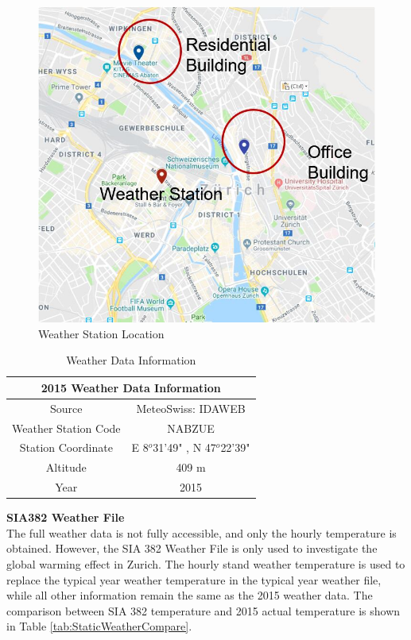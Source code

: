 \documentclass[a4paper, oneside]{discothesis}
\begin{document}
				\begin{figure}[H]
				\centering
				\includegraphics[scale=0.7]{WeatherStation.jpg}
				\caption{Weather Station Location}
				\label{fig:NABZUE}
				\end{figure}
				
				\begin{table}[htbp]
				  \centering
				  \caption{Weather Data Information}
				    \begin{tabular}{|c|c|}
				    \toprule
				    \multicolumn{2}{|c|}{\textbf{2015 Weather Data Information}} \\
				    \midrule
				    Source & MeteoSwiss: IDAWEB \\
				    \midrule
				    Weather Station Code & NABZUE \\
				    \midrule
				    Station Coordinate & E 8$^o$31'49" , N 47$^o$22'39" \\
				    \midrule
				    Altitude & 409 m \\
				    \midrule
				    Year & 2015 \\
				    \bottomrule
				    \end{tabular}%
				  \label{tab:2015DataInformation}%
				\end{table}%



			\textbf{SIA382 Weather File}\\
				The full weather data is not fully accessible, and only the hourly temperature is obtained. However, the SIA 382 Weather File is only used to investigate the global warming effect in Zurich. The hourly stand weather temperature is used to replace the typical year weather temperature in the typical year weather file, while all other information remain the same as the 2015 weather data. The comparison between SIA 382 temperature and 2015 actual temperature is shown in Table \ref{tab:StaticWeatherCompare}.\\ 
\end{document}
